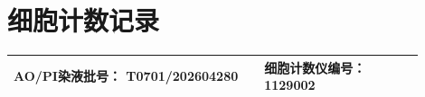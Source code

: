 \documentclass[UTF8,10pt,a4paper,fontset=fandol]{ctexart}
\newcommand{\fieldvalue}[1]{#1}
\newcommand{\handwritten}[1]{#1}
\begin{document}
\section{细胞计数记录}

\begin{center}
\begin{tabular}{|p{0.55\linewidth}|p{0.35\linewidth}|}
\hline
AO/PI染液批号：
\fieldvalue{\handwritten{T0701/202604280}}
&
细胞计数仪编号：
\fieldvalue{\handwritten{1129002}}
\\ \hline
\end{tabular}

\vspace{2mm}


\end{center}
\end{document}
